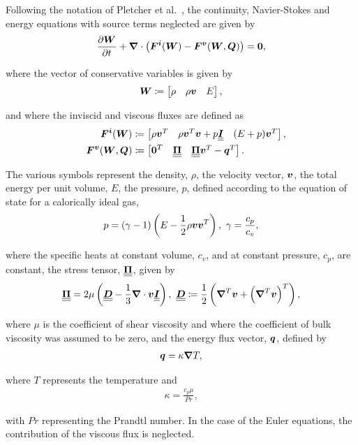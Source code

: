 Following the notation of Pletcher et al.~\cite[Chapter ]{pletcher1997}, the continuity, Navier-Stokes and energy equations with source terms neglected are given by
\begin{align} \label{eq:NavierStokes_std}
\frac{\partial \vect{W}}{\partial t} + 
\nabla \cdot \left( \vect{F^i}(\vect{W}) - \vect{F^v}(\vect{W},\vect{Q}) \right) = \vect{0},
\end{align}%

where the vector of conservative variables is given by
\begin{align*}
\bm{{W}} \coloneqq 
\begin{bmatrix} \rho & \rho\bm{{v}} & E \end{bmatrix},
\end{align*}%

and where the inviscid and viscous fluxes are defined as
\begin{align}
&& \bm{{F^i}}(\bm{{W}}) & \coloneqq
\begin{bmatrix} \rho\bm{{v}}^T & \rho \bm{{v}}^T \bm{{v}} + p \underline{\underline{\bm{I}}} & (E+p) \bm{{v}}^T \end{bmatrix}, \label{eq:F_inviscid} \\
&& \bm{{F^v}}(\bm{{W}},\bm{{Q}}) & \coloneqq
\begin{bmatrix} \bm{{0}}^T & \underline{\underline{\bm{\Pi}}} & \underline{\underline{\bm{\Pi}}} \bm{{v}}^T - \bm{{q}}^T \end{bmatrix}. \label{eq:F_viscous}
\end{align}

The various symbols represent the density, $\rho$, the velocity vector, $\bm{{v}}$, the total energy per unit volume, $E$, the pressure, $p$, defined according to the equation of state for a calorically ideal gas,
\begin{align*}
p = (\gamma-1) \left( E - \frac{1}{2} \rho \vect{v} \vect{v}^T \right),\ \gamma = \frac{c_p}{c_v}, 
\end{align*}

where the specific heats at constant volume, $c_v$, and at constant pressure, $c_p$, are constant, the stress tensor, $\underline{\underline{\bm{\Pi}}}$, given by
\begin{align*}
\tens{\Pi} = 2\mu \left( \tens{D} - \frac{1}{3} \nabla \cdot \vect{v} \tens{I} \right),\ \tens{D} \coloneqq \frac{1}{2} \left(\nabla^T \vect{v} + \left(\nabla^T \vect{v}\right)^T \right),
\end{align*}

where $\mu$ is the coefficient of shear viscosity and where the coefficient of bulk viscosity was assumed to be zero, and the energy flux vector, $\bm{{q}}$, defined by
\begin{align*}
\vect{q} = \kappa \nabla T,
\end{align*}

where $T$ represents the temperature and
\begin{align*}
\kappa = \frac{c_p \mu}{Pr},
\end{align*}

with $Pr$ representing the Prandtl number. In the case of the Euler equations, the contribution of the viscous flux is neglected.
